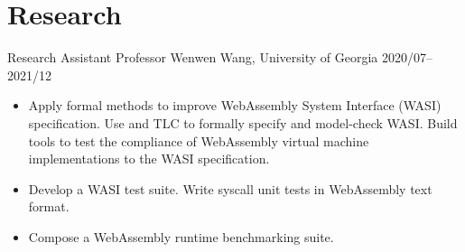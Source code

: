 \section{Research}

\begin{experiencelist}
    \experienceitem
        {Research Assistant}
        {Professor Wenwen Wang, University of Georgia}
        {2020/07--2021/12}
    \begin{itemize}[noitemsep, topsep=0pt]
        \item
            Apply formal methods to improve WebAssembly System Interface (WASI)
            specification. Use \tlaplus and TLC to formally specify and
            model-check WASI. Build tools to test the compliance of WebAssembly
            virtual machine implementations to the WASI specification.
        \item
            Develop a WASI test suite. Write syscall unit tests in WebAssembly
            text format.
        \item Compose a WebAssembly runtime benchmarking suite.
    \end{itemize}
\end{experiencelist}
